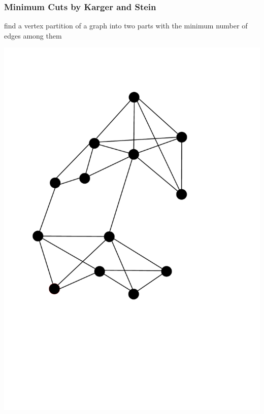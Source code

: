 \documentclass[titlepage,german,presentation]{beamer}
\begin{document}
\begin{frame}
\frametitle{Minimum Cuts by Karger and Stein}
\begin{block}{}
  find a vertex partition of a graph into two parts with the minimum number of edges among them
\end{block}
\includegraphics[height=0.6\textheight]{min-cut-1.pdf}

\end{frame}
\end{document}
